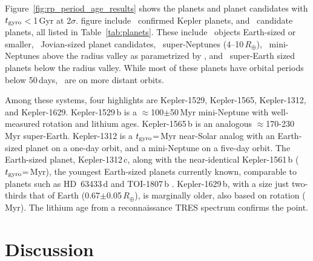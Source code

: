 \documentclass[11pt,twocolumn,tighten]{aastex63}
\begin{document}
Figure~\ref{fig:rp_period_age_results} shows the planets and planet
candidates with $t_{\rm gyro}$$<$1\,Gyr at 2$\sigma$.   figure
include \nconfirmedplyounggyrotwosigmanograzingnoruwe\ confirmed
Kepler planets, and \ncandidateplyounggyrotwosigmanograzingnoruwe\
candidate planets, all listed in Table~\ref{tab:planets}.
These include \nearthshighq\ objects Earth-sized or smaller,
\njupitershighq\ Jovian-sized planet candidates, \nsubsaturnshighq\
super-Neptunes (4--10\,$R_\oplus$), \nminineptuneshighq\ mini-Neptunes
above the radius valley as parametrized by
\citealt{2018MNRAS.479.4786V}, and \nsuperearthshighq\ super-Earth
sized planets below the radius valley.  While most of these planets
have orbital periods below 50\,days, \nlongperiodhighq\ are on more
distant orbits.

Among these systems, four highlights are Kepler-1529, Kepler-1565,
Kepler-1312, and Kepler-1629.  Kepler-1529\,b is a
$\approx$100$\pm$50\,Myr mini-Neptune with well-measured rotation and
lithium ages.  Kepler-1565\,b is an analogous $\approx$170-230\,Myr
super-Earth.  Kepler-1312 is a $t_{\rm gyro}$=\kepthirteentwelve\,Myr
near-Solar analog with an Earth-sized planet on a one-day orbit, and a
mini-Neptune on a five-day orbit.  The Earth-sized planet,
Kepler-1312\,c, along with the near-identical Kepler-1561\,b ($t_{\rm
gyro}$=\kepfifteensixone\,Myr),  the youngest Earth-sized
planets currently known, \added{and are }comparable to planets such as HD~63433\,d
\citep[1.1\,$R_\oplus$, $414$$\pm$$23$\,Myr;][]{2024AJ....167...54C}
and TOI-1807\,b \citep[1.3\,$R_\oplus$,
180$\pm$40\,Myr;][]{2021AJ....162...54H}.  Kepler-1629\,b, with a size
just two-thirds that of Earth (0.67$\pm$0.05\,$R_\oplus$), is
marginally older, also based on rotation (\kepsixteentwonine\,Myr).
The lithium age from a reconnaissance TRES spectrum confirms the
point.


\section{Discussion}
\label{sec:disc}
\end{document}
